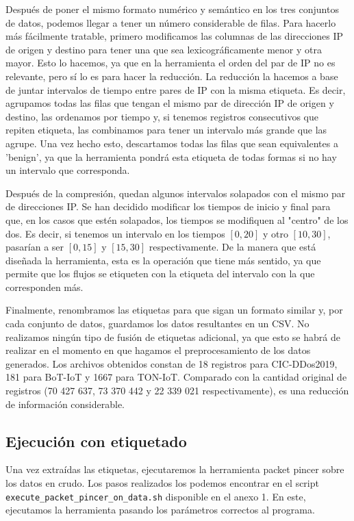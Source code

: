 Después de poner el mismo formato numérico y semántico en los tres conjuntos de datos, podemos llegar a tener un número considerable de filas. Para hacerlo más fácilmente tratable, primero modificamos las columnas de las direcciones IP de origen y destino para tener una que sea lexicográficamente menor y otra mayor. Esto lo hacemos, ya que en la herramienta el orden del par de IP no es relevante, pero sí lo es para hacer la reducción. La reducción la hacemos a base de juntar intervalos de tiempo entre pares de IP con la misma etiqueta. Es decir, agrupamos todas las filas que tengan el mismo par de dirección IP de origen y destino, las ordenamos por tiempo y, si tenemos registros consecutivos que repiten etiqueta, las combinamos para tener un intervalo más grande que las agrupe. Una vez hecho esto, descartamos todas las filas que sean equivalentes a 'benign', ya que la herramienta pondrá esta etiqueta de todas formas si no hay un intervalo que corresponda.

Después de la compresión, quedan algunos intervalos solapados con el mismo par de direcciones IP. Se han decidido modificar los tiempos de inicio y final para que, en los casos que estén solapados, los tiempos se modifiquen al "centro" de los dos. Es decir, si tenemos un intervalo en los tiempos $[0, 20]$ y otro $[10, 30]$, pasarían a ser $[0, 15]$ y $[15, 30]$ respectivamente. De la manera que está diseñada la herramienta, esta es la operación que tiene más sentido, ya que permite que los flujos se etiqueten con la etiqueta del intervalo con la que corresponden más.

Finalmente, renombramos las etiquetas para que sigan un formato similar y, por cada conjunto de datos, guardamos los datos resultantes en un CSV. No realizamos ningún tipo de fusión de etiquetas adicional, ya que esto se habrá de realizar en el momento en que hagamos el preprocesamiento de los datos generados. Los archivos obtenidos constan de 18 registros para CIC-DDos2019, 181 para BoT-IoT y 1667 para TON-IoT. Comparado con la cantidad original de registros (70 427 637, 73 370 442 y 22 339 021 respectivamente), es una reducción de información considerable.

\subsection{Ejecución con etiquetado}

Una vez extraídas las etiquetas, ejecutaremos la herramienta packet pincer sobre los datos en crudo. Los pasos realizados los podemos encontrar en el script \texttt{execute\-\_packet\-\_pincer\-\_on\-\_data.sh} disponible en el anexo 1. En este, ejecutamos la herramienta pasando los parámetros correctos al programa.

